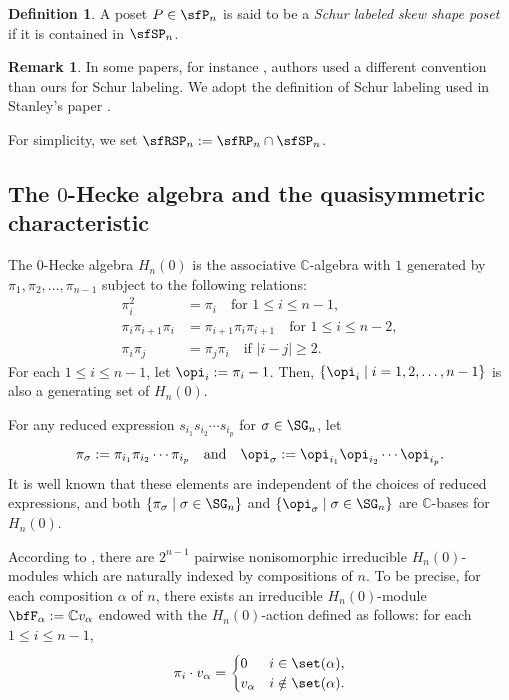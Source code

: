 \documentclass[12pt, reqno]{amsart}
\theoremstyle{definition}
\newtheorem{definition}[theorem]{Definition}
\newtheorem{remark}[theorem]{Remark}
\numberwithin{equation}{section} \numberwithin{figure}{section}
\numberwithin{table}{section}
\def\C{\mathbb C}
\begin{document}
\begin{definition}\label{def: Schur labeled skew shape posets}
A poset $P \in \sfP_n$ is said to be a \emph{Schur labeled skew shape poset} if it is contained in $\sfSP_n$.
\end{definition}


\begin{remark}
In some papers, for instance \cite{93M, 06McNamara}, authors used a different convention than ours for Schur labeling.
We adopt the definition of Schur labeling used in Stanley's paper \cite{72Stanley}.
\end{remark}




For simplicity, we set $\sfRSP_n := \sfRP_n \cap \sfSP_n$.




\subsection{The $0$-Hecke algebra and the quasisymmetric characteristic}\label{subsec: 0-Hecke alg and QSym}
The $0$-Hecke algebra $H_n(0)$ is the associative $\C$-algebra with $1$ generated by $\pi_1,\pi_2,\ldots,\pi_{n-1}$ subject to the following relations:
\begin{align*}
\pi_i^2 &= \pi_i \quad \text{for $1\le i \le n-1$},\\
\pi_i \pi_{i+1} \pi_i &= \pi_{i+1} \pi_i \pi_{i+1}  \quad \text{for $1\le i \le n-2$},\\
\pi_i \pi_j &=\pi_j \pi_i \quad \text{if $|i-j| \ge 2$}.
\end{align*}
For each $1 \leq i \leq n-1$, let $\opi_i := \pi_i - 1$. 
Then, $\{\opi_i \mid i = 1, 2, \ldots, n-1\}$ is also a generating set of $H_n(0)$.

For any reduced expression $s_{i_1} s_{i_2} \cdots s_{i_p}$ for $\sigma \in \SG_n$, let 
\[
\pi_{\sigma} := \pi_{i_1} \pi_{i_2 } \cdots \pi_{i_p} \quad \text{and} \quad \opi_{\sigma} := \opi_{i_1} \opi_{i_2} \cdots \opi_{i_p}.
\]
It is well known that these elements are independent of the choices of reduced expressions, and both $\{\pi_\sigma \mid \sigma \in \SG_n\}$ and $\{\opi_\sigma \mid \sigma \in \SG_n\}$ are $\mathbb C$-bases for $H_n(0)$.

According to \cite{79Norton}, there are $2^{n-1}$ pairwise nonisomorphic irreducible $H_n(0)$-modules which are naturally indexed by compositions of $n$.
To be precise, for each composition $\alpha$ of $n$, there exists an irreducible $H_n(0)$-module $\bfF_{\alpha}:=\C v_{\alpha}$ endowed with the $H_n(0)$-action defined as follows: for each $1 \le i \le n-1$,
\[
\pi_i \cdot v_\alpha = \begin{cases}
0 & i \in \set(\alpha),\\
v_\alpha & i \notin \set(\alpha).
\end{cases}
\]
\end{document}
